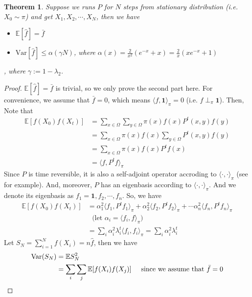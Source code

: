 \documentclass{article}
\newtheorem{theorem}{Theorem}[section]
\def\<{\langle}
\def\>{\rangle}
\begin{document}
\begin{theorem} \label{thm:start-with-pi}
  Suppose we runs $P$ for $N$ steps from stationary distribution (i.e. $X_0 \sim \pi$) and get $X_1, X_2, \cdots, X_N$, then we have
  \begin{itemize}
  \item $\mathbb{E}[\hat{f}] = \bar{f}$ 
  \item $\mathrm{Var} [\hat{f}] \leq \alpha\left(\gamma N\right)$, where $\alpha(x) = \frac{2}{x^2} (e^{-x} + x) = \frac{2}{x}(xe^{-x} + 1)$
  \end{itemize}
  , where $\gamma := 1 - \lambda_2$.
\end{theorem}
\begin{proof}
  $\mathbb{E}[\hat{f}] = \bar{f}$ is trivial, so we only prove the second part here.
  For convenience, we assume that $\bar{f} = 0$, which means $\< f, \mathbf{1}\>_\pi = 0$ (i.e. $f \perp_\pi \mathbf{1}$).
  Then, Note that
  \begin{align*}
    \mathbb{E}[f(X_0)f(X_t)]
    &= \sum_{x\in \Omega} \sum_{y\in \Omega} \pi(x) f(x) P^t(x, y) f(y) \\
    &= \sum_{x\in\Omega} \pi(x) f(x) \sum_{y\in \Omega} P^t(x, y) f(y) \\
    &= \sum_{x\in\Omega} \pi(x) f(x) P^tf(x) \\
    &= \<f, P^tf\>_\pi
  \end{align*}
  Since $P$ is time reversible, it is also a self-adjoint operator accroding to $\< \cdot, \cdot \>_\pi$ (see \cite{SomeNotesForInnerProducts@Xiaoyu} for example). And, moreover, $P$ has an eigenbasis according to $\<\cdot, \cdot\>_\pi$. And we denote its eigenbasis as $f_1 = \mathbf{1}, f_2, \cdots, f_n$.
  So, we have
  \begin{align*}
    \mathbb{E}[f(X_0)f(X_t)]
    &= \alpha_1^2 \<f_1, P^t f_1\>_\pi + \alpha_2^2 \<f_2, P^tf_2\>_\pi + \cdots \alpha_n^2 \<f_n, P^t f_n\>_\pi \\
    &\ \ \ \mbox{(let $\alpha_i = \<f_i, f\>_\pi$)} \\
    &= \sum_i \alpha_i^2\lambda_i^t \< f_i, f_i\>_\pi = \sum_i \alpha_i^2\lambda_i^t
  \end{align*}
  Let $S_N = \sum_{i=1}^N f(X_i) = n\hat{f}$, then we have
  \begin{align*}
    \mathrm{Var}(S_N)
    &= \mathbb{E} S_N^2 \\
    &= \sum_i \sum_j \mathbb{E}[f(X_i) f(X_j)] \hspace{0.5cm} \mbox{since we assume that $\bar{f} = 0$} \\

\end{align*}
\end{proof}
\end{document}
